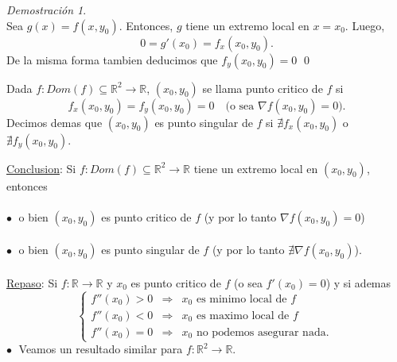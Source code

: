 \documentclass{article}
\theoremstyle{definition}
\theoremstyle{definition}
\theoremstyle{remark}
\newtheorem*{demo}{Demostración}
\newcommand\bl{$\bullet\;$}
\begin{document}
\begin{demo} \;\\
  Sea $g(x)=f(x,y_0)$. Entonces, $g$ tiene un extremo local en $x=x_0$. Luego, \[
    0=g'(x_0)=f_x(x_0,y_0).
  \]
  De la misma forma tambien deducimos que $f_y(x_0,y_0)=0$
  \qed
\end{demo} \pagebreak
\begin{defi}
  Dada $f : Dom(f) \subseteq \mathbb{R}^2 \to \mathbb{R}$, $(x_0,y_0)$ se llama punto critico de $f$ si $$f_x(x_0,y_0)=f_y(x_0,y_0)=0 \quad \big(\text{o sea }\nabla f(x_0,y_0)=0\big).$$ Decimos demas que $(x_0,y_0)$ es punto singular de $f$ si $\nexists f_x(x_0,y_0)$ o $ \nexists f_y(x_0,y_0)$.
\end{defi}
\underline{Conclusion}: Si $f: Dom(f) \subseteq \mathbb{R}^2 \to \mathbb{R}$ tiene un extremo local en $(x_0,y_0)$, entonces \\\\ \textcolor{rojop2}{\bl} o bien $(x_0,y_0)$ es punto critico de $f$ \big(y por lo tanto $\nabla f(x_0,y_0)=0$\big) \\\\
\textcolor{rojop2}{\bl} o bien $(x_0,y_0)$ es punto singular de $f$ \big(y por lo tanto $\nexists \nabla f(x_0,y_0)$\big).
\\\\
\underline{Repaso}: Si $f : \mathbb{R} \to \mathbb{R}$ y $x_0$ es punto critico de $f$ \big(o sea $f'(x_0)=0$\big) y si ademas $$\left\{
\begin{array}{lcl} 
  f''(x_0)>0 & \Rightarrow & x_0 \text{ es minimo local de } f \\
  f''(x_0)<0 & \Rightarrow & x_0 \text{ es maximo local de } f \\
  f''(x_0)=0 & \Rightarrow & x_0 \text{ no podemos asegurar nada. } 
\end{array}\right.$$
\textcolor{rojop2}{\bl} Veamos un resultado similar para $f : \mathbb{R}^2 \to \mathbb{R}$.
\end{document}
